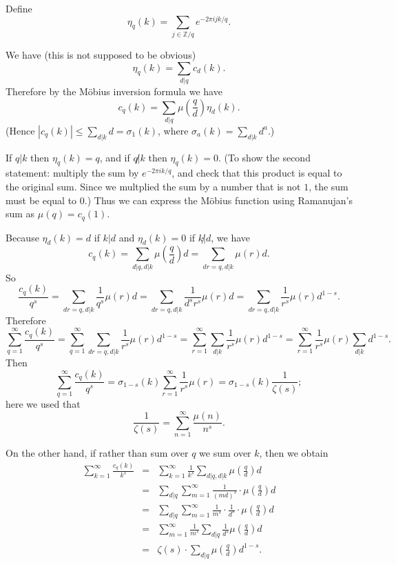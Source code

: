 \documentclass{article}
\begin{document}
Define
\[
\eta_q(k)=\sum_{j \in \mathbb{Z}/q} e^{-2\pi ijk/q}.
\]


We have (this is not supposed to be obvious)
\[
\eta_q(k)=\sum_{d|q} c_d(k).
\]
Therefore by the M\"obius inversion formula we have
\[
c_q(k)=\sum_{d|q}  \mu\left(\frac{q}{d} \right) \eta_d(k).
\]
(Hence $|c_q(k)| \leq \sum_{d|k} d = \sigma_1(k)$, where $\sigma_a(k)=\sum_{d|k} d^a$.)

If $q|k$ then $\eta_q(k)=q$, and if $q \not | k$ then $\eta_q(k)=0$. (To show the second statement: multiply the sum by $e^{-2\pi i k/q}$, and check that this product is equal to the original sum.
Since we multplied the sum by a number that is not $1$, the sum must be equal to $0$.)
Thus we can express the M\"obius function using Ramanujan's sum as $\mu(q)=c_q(1)$. 

Because $\eta_d(k)=d$ if $k | d$ and $\eta_d(k)=0$ if $k \not | d$, we have
\[
c_q(k)=\sum_{d|q, d|k} \mu\left( \frac{q}{d} \right) d=\sum_{dr=q, d|k} \mu(r) d.
\] 
So
\[
\frac{c_q(k)}{q^s}=\sum_{dr=q, d|k} \frac{1}{q^s} \mu(r) d = \sum_{dr=q, d|k} \frac{1}{d^s r^s} \mu(r) d =  \sum_{dr=q, d|k} \frac{1}{r^s} \mu(r) d^{1-s}.
\]
Therefore
\[
\sum_{q=1}^\infty \frac{c_q(k)}{q^s} = \sum_{q=1}^\infty \sum_{dr=q, d|k} \frac{1}{r^s} \mu(r) d^{1-s} = \sum_{r=1}^\infty \sum_{d|k} \frac{1}{r^s} \mu(r) d^{1-s}
=\sum_{r=1}^\infty  \frac{1}{r^s} \mu(r) \sum_{d|k} d^{1-s}.
\]
Then
\[
\sum_{q=1}^\infty \frac{c_q(k)}{q^s} = \sigma_{1-s}(k) \sum_{r=1}^\infty  \frac{1}{r^s} \mu(r)= \sigma_{1-s}(k) \frac{1}{\zeta(s)};
\]
here we used that 
\[
\frac{1}{\zeta(s)}=\sum_{n=1}^\infty \frac{\mu(n)}{n^s}.
\]

On the other hand, if rather than sum over $q$ we sum over $k$, then we obtain
\begin{eqnarray*}
\sum_{k=1}^\infty \frac{c_q(k)}{k^s}&=&\sum_{k=1}^\infty \frac{1}{k^s}\sum_{d|q, d|k} \mu\left( \frac{q}{d} \right) d\\
&=&\sum_{d|q} \sum_{m=1}^\infty \frac{1}{(md)^s}  \cdot  \mu\left( \frac{q}{d} \right) d\\
&=&\sum_{d|q} \sum_{m=1}^\infty \frac{1}{m^s} \cdot \frac{1}{d^s}  \cdot \mu\left( \frac{q}{d} \right) d\\
&=&\sum_{m=1}^\infty \frac{1}{m^s} \sum_{d|q}\frac{1}{d^s}  \mu\left( \frac{q}{d} \right) d\\
&=&\zeta(s) \cdot \sum_{d|q}  \mu\left( \frac{q}{d} \right) d^{1-s}.
\end{eqnarray*}
\end{document}
